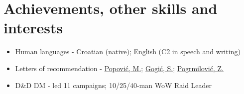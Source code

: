\documentclass[a4paper]{article}
\begin{document}
\section{Achievements, other skills and interests}

\begin{itemize}
  \item Human languages - Croatian (native); English (C2 in speech and writing)
  \item Letters of recommendation - \href{https://github.com/MislavJaksic/Latex-Overleaf/blob/master/CV/AISoft_Popovic.pdf}{Popović, M.}; \href{https://github.com/MislavJaksic/Latex-Overleaf/blob/master/CV/Atos_Gogic.pdf}{Gogić, S.}; \href{https://github.com/MislavJaksic/Latex-Overleaf/blob/master/CV/Atos_Pogrmilovic.pdf}{Pogrmilović, Z.}
  \item D\&D DM - led 11 campaigns; 10/25/40-man WoW Raid Leader
\end{itemize}
\end{document}
